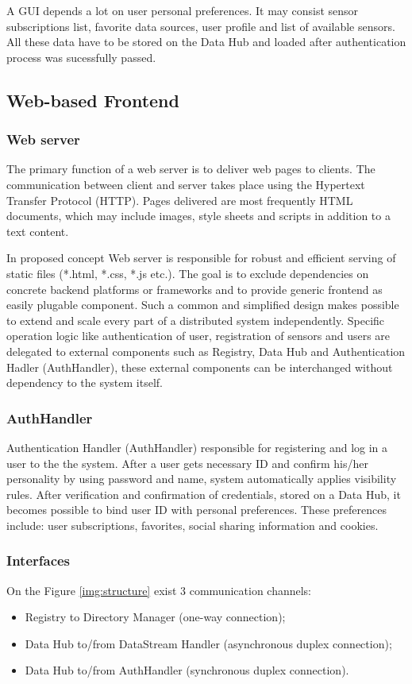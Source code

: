     A GUI depends a lot on user personal preferences. It may consist sensor subscriptions list, favorite data sources, user profile and list of available sensors. All these data have to be stored on the Data Hub and loaded after authentication process was sucessfully passed.

  \subsection{Web-based Frontend}
  \label{section:web-frontend}
    \subsubsection{Web server}
    The primary function of a web server is to deliver web pages to clients. The communication between client and server takes place using the Hypertext Transfer Protocol (HTTP). Pages delivered are most frequently HTML documents, which may include images, style sheets and scripts in addition to a text content. 
  
    In proposed concept Web server is responsible for robust and efficient serving of static files (*.html, *.css, *.js etc.). The goal is to exclude dependencies on concrete backend platforms or frameworks and to provide generic frontend as easily plugable component. Such a common and simplified design makes possible to extend and scale every part of a distributed system independently. Specific operation logic like authentication of user, registration of sensors and users are delegated to external components such as Registry, Data Hub and Authentication Hadler (AuthHandler), these external components can be interchanged without dependency to the system itself.

    \subsubsection{AuthHandler}
    Authentication Handler (AuthHandler) responsible for registering and log in a user to the the system. After a user gets necessary ID and confirm his/her personality by using password and name, system automatically applies visibility rules. After verification and confirmation of credentials, stored on a Data Hub, it becomes possible to bind user ID with personal preferences. These preferences include: user subscriptions, favorites, social sharing information and cookies.

    \subsubsection{Interfaces}
      On the Figure \ref{img:structure} exist 3 communication channels: 
      \begin{itemize}
      \item Registry to Directory Manager (one-way connection);
      \item Data Hub to/from DataStream Handler (asynchronous duplex connection);
      \item Data Hub to/from AuthHandler (synchronous duplex connection). 
      \end{itemize}

